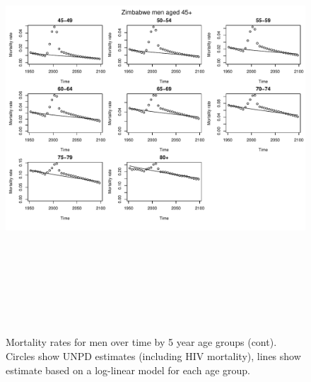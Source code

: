 \documentclass{article}
\begin{document}
\begin{figure}
\includegraphics[width=16cm,height=16cm]{EstimatingRatesFromUNPDv2-MortalityMen2} 

\caption{Mortality rates for men over time by 5 year age groups (cont). Circles show UNPD estimates (including HIV mortality), lines show estimate based on a log-linear model for each age group.}
\label{Mortalitymen1}
\end{figure}
\end{document}

